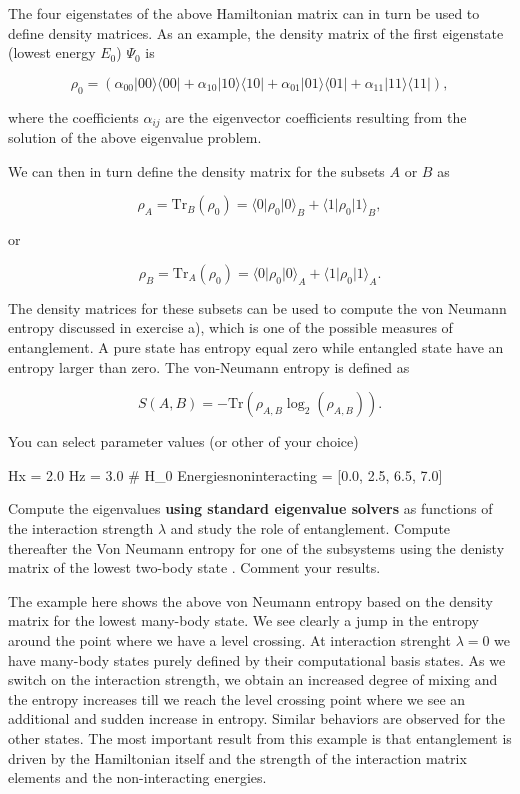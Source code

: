 \documentclass[%
oneside,                 %
final,                   %
10pt]{article}
\begin{document}
The four eigenstates of the above Hamiltonian matrix can in turn be used to
define density matrices. As an example, the density matrix of the
first eigenstate (lowest energy $E_0$) $\Psi_0$ is

\[
\rho_0=\left(\alpha_{00}\vert 00 \rangle\langle 00\vert+\alpha_{10}\vert 10 \rangle\langle 10\vert+\alpha_{01}\vert 01 \rangle\langle 01\vert+\alpha_{11}\vert 11 \rangle\langle 11\vert\right),
\]

where the coefficients $\alpha_{ij}$ are the eigenvector coefficients
resulting from the solution of the above eigenvalue problem.

We can
then in turn define the density matrix for the subsets $A$ or $B$ as

\[
\rho_A=\mathrm{Tr}_B(\rho_{0})=\langle 0 \vert \rho_{0} \vert 0\rangle_{B}+\langle 1 \vert \rho_{0} \vert 1\rangle_{B},
\]

or

\[
\rho_B=\mathrm{Tr}_A(\rho_0)=\langle 0 \vert \rho_{0} \vert 0\rangle_{A}+\langle 1 \vert \rho_{0} \vert 1\rangle_{A}.
\]

The density matrices for these subsets can be used to compute the
von Neumann entropy discussed in exercise a), which is one of the possible measures
of entanglement. A pure state has entropy equal zero while entangled
state have an entropy larger than zero. The von-Neumann entropy is
defined as

\[
S(A,B)=-\mathrm{Tr}\left(\rho_{A,B}\log_2 (\rho_{A,B})\right).
\]

You can select parameter values (or other of your choice)





\bpycod
Hx = 2.0
Hz = 3.0
# H_0
Energiesnoninteracting = [0.0, 2.5, 6.5, 7.0]

\epycod


Compute the eigenvalues \textbf{using standard eigenvalue solvers} as functions of
the interaction strength $\lambda$ and study the role of entanglement.
Compute thereafter the Von Neumann entropy for one of the subsystems using the denisty matrix  of the lowest
two-body state . Comment your results.

The example here shows the above von Neumann entropy based on the
density matrix for the lowest many-body state. We see clearly a jump
in the entropy around the point where we have a level crossing. At
interaction strenght $\lambda=0$ we have many-body states purely
defined by their computational basis states. As we switch on the
interaction strength, we obtain an increased degree of mixing and the
entropy increases till we reach the level crossing point where we see
an additional and sudden increase in entropy. Similar behaviors are
observed for the other states. The most important result from this
example is that entanglement is driven by the Hamiltonian itself and
the strength of the interaction matrix elements and the
non-interacting energies.
\end{document}
